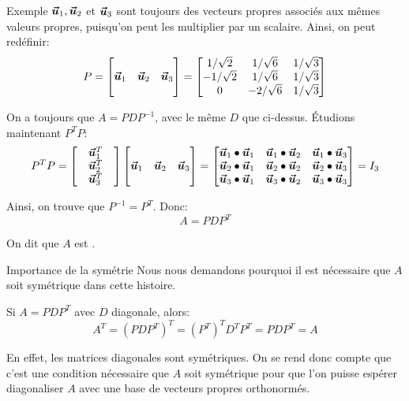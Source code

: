 \documentclass[a4paper]{article}
\begin{document}
\begin{parag}{Exemple}
    $\bm{\protect\vec{u}}_1, \bm{\protect\vec{u}}_2$ et $\bm{\protect\vec{u}}_3$ sont toujours des vecteurs propres associés aux mêmes valeurs propres, puisqu'on peut les multiplier par un scalaire. Ainsi, on peut redéfinir:
    \[P = \begin{bmatrix}  &  &  \\ \bm{\protect\vec{u}}_1 & \bm{\protect\vec{u}}_2 & \bm{\protect\vec{u}}_3 \\  &  &  \end{bmatrix} = \begin{bmatrix} 1 / \sqrt{2} & 1 / \sqrt{6} & 1 / \sqrt{3} \\ -1 / \sqrt{2} & 1 / \sqrt{6} & 1 / \sqrt{3} \\ 0 & -2 / \sqrt{6} & 1 / \sqrt{3} \end{bmatrix} \]

    On a toujours que $A = PDP^{-1}$, avec le même $D$ que ci-dessus. Étudions maintenant $P^T P$:
    \[P^T P = \begin{bmatrix}  & \bm{\protect\vec{u}}_1^T &  \\  & \bm{\protect\vec{u}}_2^T &  \\  & \bm{\protect\vec{u}}_3^T &  \end{bmatrix} \begin{bmatrix}  &  &  \\ \bm{\protect\vec{u}}_1 & \bm{\protect\vec{u}}_2 & \bm{\protect\vec{u}}_3 \\  &  &  \end{bmatrix} = \begin{bmatrix} \bm{\protect\vec{u}}_1 \bullet \bm{\protect\vec{u}}_1 & \bm{\protect\vec{u}}_1 \bullet \bm{\protect\vec{u}}_2 & \bm{\protect\vec{u}}_1 \bullet \bm{\protect\vec{u}}_3 \\ \bm{\protect\vec{u}}_2 \bullet \bm{\protect\vec{u}}_1 & \bm{\protect\vec{u}}_2 \bullet \bm{\protect\vec{u}}_2 & \bm{\protect\vec{u}}_2 \bullet \bm{\protect\vec{u}}_3 \\ \bm{\protect\vec{u}}_3 \bullet \bm{\protect\vec{u}}_1 & \bm{\protect\vec{u}}_3 \bullet \bm{\protect\vec{u}}_2  & \bm{\protect\vec{u}}_3 \bullet \bm{\protect\vec{u}}_3\end{bmatrix} = I_3  \]

    Ainsi, on trouve que $P^{-1} = P^T$. Donc:
    \[A = PDP^T\]

    On dit que $A$ est .

    \begin{subparag}{Importance de la symétrie}
        Nous nous demandons pourquoi il est nécessaire que $A$ soit symétrique dans cette histoire.

        Si $A = PDP^T$ avec $D$ diagonale, alors:
        \[A^T = \left(PDP^T\right)^T = \left(P^T\right)^T D^T P^T = P D P^T = A\]

        En effet, les matrices diagonales sont symétriques. On se rend donc compte que c'est une condition nécessaire que $A$ soit symétrique pour que l'on puisse espérer diagonaliser $A$ avec une base de vecteurs propres orthonormés.


\end{subparag}
\end{parag}
\end{document}
